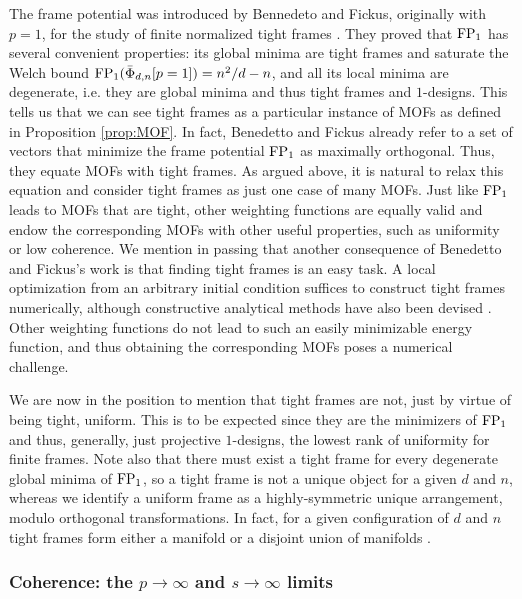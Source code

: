 \documentclass[%
superscriptaddress,
amsmath,amssymb,
 aps,
pra,
floatfix,
]{revtex4-2}
\begin{document}
The frame potential was introduced by Bennedeto and Fickus, originally with $p=1$, for the study of finite normalized tight frames \cite{benedetto2003finite}. They proved that ${\rm FP}_1$ has several convenient properties: its global minima are tight frames and saturate the Welch bound ${\rm FP}_1(\bar \Phi_{d, n} [p = 1]) = n^2/d - n$, and all its local minima are degenerate, i.e. they are global minima and thus tight frames and $1$-designs. This tells us that we can see tight frames as a particular instance of MOFs as defined in Proposition \ref{prop:MOF}. In fact, Benedetto and Fickus already refer to a set of vectors that minimize the frame potential ${\rm FP}_1$ as maximally orthogonal. Thus, they equate MOFs with tight frames. As argued above, it is natural to relax this equation and consider tight frames as just one case of many MOFs. Just like ${\rm FP}_1$ leads to MOFs that are tight, other weighting functions are equally valid and endow the corresponding MOFs with other useful properties, such as uniformity or low coherence.
We mention in passing that another consequence of Benedetto and Fickus's work is that finding tight frames is an easy task. A local optimization from an arbitrary initial condition suffices to construct tight frames numerically, although constructive analytical methods have also been devised \cite{casazza2012autotuning, cahill2013constructing}. Other weighting functions do not lead to such an easily minimizable energy function, and thus obtaining the corresponding MOFs poses a numerical challenge.

We are now in the position to mention that tight frames are not, just by virtue of being tight, uniform. This is to be expected since they are the minimizers of ${\rm FP}_1$ and thus, generally, just projective $1$-designs, the lowest rank of uniformity for finite frames. Note also that there must exist a tight frame for every degenerate global minima of ${\rm FP}_1$, so a tight frame is not a unique object for a given $d$ and $n$, whereas we identify a uniform frame as a highly-symmetric unique arrangement, modulo orthogonal transformations. In fact, for a given configuration of $d$ and $n$ tight frames form either a manifold or a disjoint union of manifolds \cite{dykema2003manifold}.  

\subsubsection{Coherence: the $p \to \infty$ and $s \to \infty$ limits}
\label{coherence}
\end{document}
